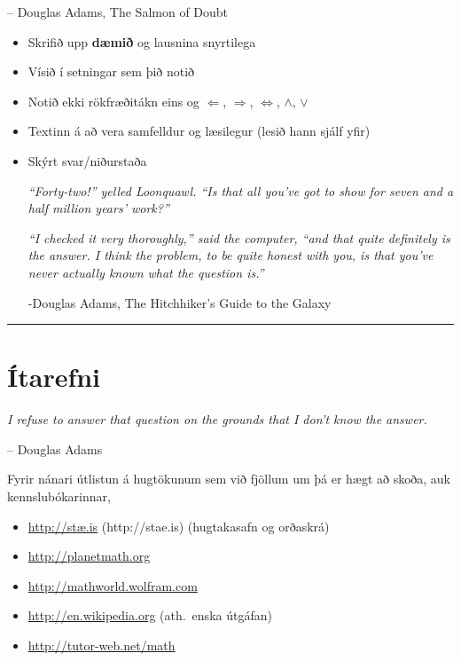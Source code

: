 \documentclass[a4paper,10pt,icelandic]{sphinxmanual}
\begin{document}
-- Douglas Adams, The Salmon of Doubt
\begin{itemize}
\item {} 
Skrifið upp \textbf{dæmið} og lausnina snyrtilega

\item {} 
Vísið í setningar sem þið notið

\item {} 
Notið ekki rökfræðitákn eins og \(\Leftarrow\),
\(\Rightarrow\), \(\Leftrightarrow\), \(\wedge\),
\(\vee\)

\item {} 
Textinn á að vera samfelldur og læsilegur (lesið hann sjálf yfir)

\item {} 
Skýrt svar/niðurstaða

\emph{“Forty-two!” yelled Loonquawl. “Is that all you’ve got to show for
seven and a half million years’ work?”}

\emph{“I checked it very thoroughly,” said the computer, “and that quite
definitely is the answer. I think the problem, to be quite honest with
you, is that you’ve never actually known what the question is.”}

-Douglas Adams, The Hitchhiker's Guide to the Galaxy

\end{itemize}


\bigskip\hrule{}\bigskip

\newpage

\section{Ítarefni}
\label{vidauki:itarefni}
\emph{I refuse to answer that question on the grounds that I don't know the answer.}

-- Douglas Adams

Fyrir nánari útlistun á hugtökunum sem við fjöllum um þá er hægt að skoða,
auk kennslubókarinnar,
\begin{itemize}
\item {} 
\href{http://stae.is}{http://stæ.is} (http://stae.is) (hugtakasafn og orðaskrá)

\item {} 
\url{http://planetmath.org}

\item {} 
\url{http://mathworld.wolfram.com}

\item {} 
\url{http://en.wikipedia.org} (ath. enska útgáfan)

\item {} 
\url{http://tutor-web.net/math}

\end{itemize}
\end{document}
